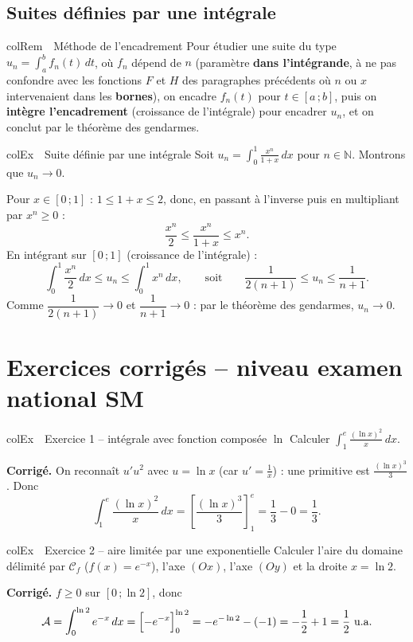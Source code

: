 \documentclass[11pt,a4paper]{article}
\newenvironment{exemple}[1][Exemple]
  {\begin{fiche}{colEx}{\ding{217}~~#1}}{\end{fiche}}
\newenvironment{remarque}[1][Remarque]
  {\begin{fiche}{colRem}{\ding{43}~~#1}}{\end{fiche}}
\begin{document}
\subsection{Suites définies par une intégrale}

\begin{remarque}[Méthode de l'encadrement]
Pour étudier une suite du type $u_n=\displaystyle\int_a^b f_n(t)\,dt$, où $f_n$ dépend de $n$ (paramètre \textbf{dans l'intégrande}, à ne pas confondre avec les fonctions $F$ et $H$ des paragraphes précédents où $n$ ou $x$ intervenaient dans les \textbf{bornes}), on encadre $f_n(t)$ pour $t\in[a\,;b]$, puis on \textbf{intègre l'encadrement} (croissance de l'intégrale) pour encadrer $u_n$, et on conclut par le théorème des gendarmes.
\end{remarque}

\begin{exemple}[Suite définie par une intégrale]
Soit $u_n=\displaystyle\int_0^1\frac{x^n}{1+x}\,dx$ pour $n\in\mathbb{N}$. Montrons que $u_n\to0$.

\smallskip
Pour $x\in[0\,;1]$ : $1\leq1+x\leq2$, donc, en passant à l'inverse puis en multipliant par $x^n\geq0$ :
\[
  \frac{x^n}2 \leq \frac{x^n}{1+x} \leq x^n.
\]
En intégrant sur $[0\,;1]$ (croissance de l'intégrale) :
\[
  \int_0^1\frac{x^n}2\,dx \leq u_n \leq \int_0^1x^n\,dx,
  \qquad\text{soit}\qquad
  \frac{1}{2(n+1)} \leq u_n \leq \frac{1}{n+1}.
\]
Comme $\dfrac{1}{2(n+1)}\to0$ et $\dfrac{1}{n+1}\to0$ : par le théorème des gendarmes, $u_n\to0$.
\end{exemple}

\section{Exercices corrigés -- niveau examen national SM}

\begin{exemple}[Exercice 1 -- intégrale avec fonction composée $\ln$]
Calculer $\displaystyle\int_1^e\frac{(\ln x)^2}{x}\,dx$.

\smallskip
\textbf{Corrigé.} On reconnaît $u'u^2$ avec $u=\ln x$ (car $u'=\frac1x$) : une primitive est $\frac{(\ln x)^3}{3}$. Donc
\[
  \int_1^e\frac{(\ln x)^2}{x}\,dx = \left[\frac{(\ln x)^3}{3}\right]_1^e = \frac{1}{3}-0 = \frac13.
\]
\end{exemple}

\begin{exemple}[Exercice 2 -- aire limitée par une exponentielle]
Calculer l'aire du domaine délimité par $\mathcal{C}_f$ ($f(x)=e^{-x}$), l'axe $(Ox)$, l'axe $(Oy)$ et la droite $x=\ln2$.

\smallskip
\textbf{Corrigé.} $f\geq0$ sur $[0\,;\ln2]$, donc
\[
  \mathcal{A} = \int_0^{\ln2}e^{-x}\,dx = \Bigl[-e^{-x}\Bigr]_0^{\ln2} = -e^{-\ln2}-(-1) = -\frac12+1 = \frac12 \text{ u.a.}
\]
\end{exemple}
\end{document}
